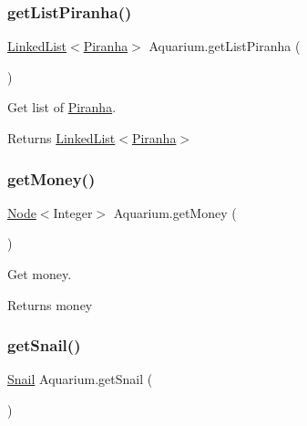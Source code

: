\subsubsection{\texorpdfstring{get\+List\+Piranha()}{getListPiranha()}}
{\footnotesize\ttfamily \mbox{\hyperlink{class_linked_list}{Linked\+List}}$<$\mbox{\hyperlink{class_piranha}{Piranha}}$>$ Aquarium.\+get\+List\+Piranha (\begin{DoxyParamCaption}{ }\end{DoxyParamCaption})\hspace{0.3cm}{\ttfamily [inline]}}

Get list of \mbox{\hyperlink{class_piranha}{Piranha}}.

\begin{DoxyReturn}{Returns}
\mbox{\hyperlink{class_linked_list}{Linked\+List$<$\+Piranha$>$}} 
\end{DoxyReturn}
\mbox{\label{class_aquarium_aed777455bcb78b66ee3908b8be819372}} 
\subsubsection{\texorpdfstring{get\+Money()}{getMoney()}}
{\footnotesize\ttfamily \mbox{\hyperlink{class_node}{Node}}$<$Integer$>$ Aquarium.\+get\+Money (\begin{DoxyParamCaption}{ }\end{DoxyParamCaption})\hspace{0.3cm}{\ttfamily [inline]}}

Get money.

\begin{DoxyReturn}{Returns}
money 
\end{DoxyReturn}
\mbox{\label{class_aquarium_ac00cb1b361c2b368370f3fd1225ff296}} 
\subsubsection{\texorpdfstring{get\+Snail()}{getSnail()}}
{\footnotesize\ttfamily \mbox{\hyperlink{class_snail}{Snail}} Aquarium.\+get\+Snail (\begin{DoxyParamCaption}{ }\end{DoxyParamCaption})\hspace{0.3cm}{\ttfamily [inline]}}

